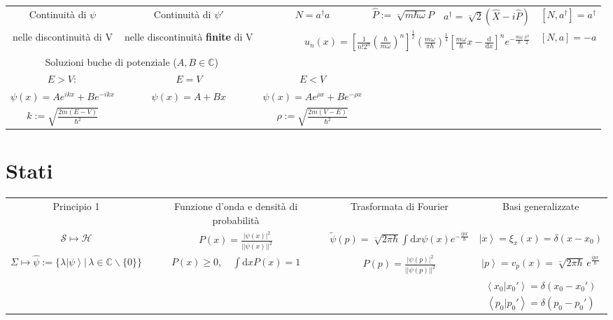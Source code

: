 \documentclass{article}
\newcommand{\ngrt}[2][]{
    \sqrt[\mathbf{-}#1]{#2}
}
\newcommand{\ket}[1]{
    \left| #1 \right\rangle
}
\newcommand{\bkprod}[2]{
    \left\langle #1 | #2 \right\rangle
}
\begin{document}
\begin{tabular}{cccccc}
    Continuità di $\psi$ & \multicolumn{1}{c|}{Continuità di $\psi' $} & $N = a^\dagger a $ & $\hat{P} := \ngrt{m\hbar\omega}P $ & $a^\dagger = \ngrt{2}(\hat{X}-i\hat{P}) $ & $[N, a^\dagger] = a^\dagger $ \\
    nelle discontinuità di V & \multicolumn{1}{c|}{nelle discontinuità \textbf{finite} di V} & \multicolumn{3}{r}{$u_n(x) = \left[\frac{1}{n!2^n}\left(\frac{\hbar}{m\omega}\right)^n\right]^\frac{1}{2} \left(\frac{m\omega}{\pi\hbar}\right)^\frac{1}{4}\left[\frac{m\omega}{\hbar}x-\frac{\mathrm{d}}{\mathrm{d}x}\right]^n e^{-\frac{m\omega}{\hbar}\frac{x^2}{2}} $} & $[N, a] = -a $ \\
    \cline{3-6}
    \multicolumn{2}{c|}{Soluzioni buche di potenziale ($A, B \in \mathbb{C}$)} \\
    \cline{3-3}
    $E > V: $ & $E = V $ & \multicolumn{1}{c|}{$E < V $} \\
    $\psi(x) = Ae^{ikx} + Be^{-ikx} $ & $\psi(x) = A + Bx $ & \multicolumn{1}{c|}{$\psi(x) = Ae^{\rho x} + Be^{-\rho x} $} \\
    \cline{2-2}
    \multicolumn{1}{c|}{$k := \sqrt{\frac{2m(E-V)}{\hbar^2}} $} & \multicolumn{1}{c|}{} & \multicolumn{1}{c|}{$\rho := \sqrt{\frac{2m(V-E)}{\hbar^2}} $} \\
    \cline{1-1} \cline{3-3}
\end{tabular}

\newpage \newpage

\section*{Stati}

\begin{tabular}{cccc}
    Principio 1 & Funzione d'onda e densità di probabilità & Trasformata di Fourier & Basi generalizzate \\
    $\mathcal{S} \mapsto \mathcal{H} $ & $P(x) =  \frac{|\psi(x)|^2}{||\psi(x)||^2} $ & $\widetilde{\psi}(p) =  \ngrt{2\pi\hbar}\int\mathrm{d}x\psi(x)e^{-\frac{ipx}{\hbar}} $ & $\ket{x} = \xi_x(x) = \delta(x-x_0) $ \\
    $\Sigma \mapsto \hat{\psi} := \{\lambda\ket{\psi} |\, \lambda\in\mathbb{C}\backslash\{0\} \} $ & $P(x) \geq 0,\quad  \int \mathrm{d}x P(x) = 1 $ & $P(p) =  \frac{|\psi(p)|^2}{||\psi(p)||^2} $ & $\ket{p} = v_p (x) = \ngrt{2\pi\hbar}\,e^{\frac{ipx}{\hbar}} $ \\
     &  &  & $\bkprod{x_0}{x_0'} = \delta(x_0 - x_0') $ \\
     &  &  & $\bkprod{p_0}{p_0'} = \delta(p_0 - p_0') $
\end{tabular}
\end{document}

